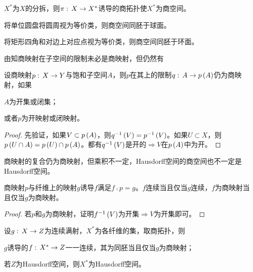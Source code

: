 \documentclass{ctexrep}
\begin{document}
  \begin{definition}
    $X^*$为$X$的分拆，则$\pi:\, X \rightarrow X^*$诱导的商拓扑使$X^*$为商空间。
  \end{definition}
  \begin{ex}
    将单位圆盘将圆周视为等价类，则商空间同胚于球面。
  \end{ex}
  \begin{ex}
    将矩形四角和对边上对应点视为等价类，则商空间同胚于环面。
  \end{ex}
  由知商映射在子空间的限制未必是商映射，但仍然有
  \begin{theorem}
    设商映射$p:\, X \rightarrow Y$与饱和子空间$A$，则$p$在其上的限制$q:\, A \rightarrow p\left(A\right)$仍为商映射，如果
    \begin{cenum}
      \item $A$为开集或闭集；
      \item 或者$p$为开映射或闭映射。
    \end{cenum}
  \end{theorem}
  \begin{proof}
    先验证，如果$V\subset p\left(A\right)$，则$q^{-1}\left(V\right) = p^{-1}\left(V\right)$。如果$U\subset X$，则$p\left(U\cap A\right)=p\left(U\right)\cap p\left(A\right)$。都有$q^{-1}\left(V\right)$是开的$\Rightarrow V$在$p\left(A\right)$中为开。
  \end{proof}
  商映射的复合仍为商映射，但乘积不一定，Hausdorff空间的商空间也不一定是Hausdorff空间。
  \begin{theorem}
    商映射$p$与纤维上的映射$g$诱导$f$满足$f\comp p=g$。$f$连续当且仅当$g$连续，$f$为商映射当且仅当$g$为商映射。
  \end{theorem}
  \centerline{}{}
  \begin{proof}
    若$p$和$g$为商映射，证明$f^{-1}\left(V\right)$为开集$\Rightarrow V$为开集即可。
  \end{proof}
  \begin{corollary}
    设$g:\, X \rightarrow Z$为连续满射，$X^*$为各纤维的集，取商拓扑，则
    \begin{cenum}
      \item $g$诱导的$f:\, X^* \rightarrow Z$一一连续，其为同胚当且仅当$g$为商映射；
      \item 若$Z$为Hausdorff空间，则$X^*$为Hausdorff空间。
    \end{cenum}
  \end{corollary}
  \centerline{}{}
\end{document}

